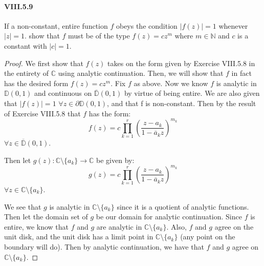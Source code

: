 \documentclass[10pt]{article}
\begin{document}
\maketitle


\paragraph{VIII.5.9}
If a non-constant, entire function $f$ obeys the condition $|f(z)| = 1$ whenever $|z| = 1$. show that $f$ must be of the type $f(z) = cz^m$ where $m \in \mathbb{N}$ and $c$ is a constant with $|c| = 1$. 

\begin{proof}
We first show that $f(z)$ takes on the form given by Exercise VIII.5.8 in the entirety of $\mathbb{C}$ using analytic continuation. Then, we will show that $f$ in fact has the desired form $f(z) = cz^m$. Fix $f$ as above. Now we know $f$ is analytic in $\mathbb{D}(0,1)$ and continuous on $\overline{\mathbb{D}}(0,1)$ by virtue of being entire. We are also given that $|f(z)| = 1$ $\forall z \in \partial \mathbb{D}(0,1)$, and that f is non-constant. Then by the result of Exercise VIII.5.8 that $f$ has the form: 
\[f(z) = c \prod_{k = 1}^r \left(\frac{z - a_k}{1 - \overline{a}_kz}\right)^{m_k}\]
$\forall z \in \overline{\mathbb{D}}(0,1)$. 

	 Then let $g(z):\mathbb{C} \setminus \{a_k\} \rightarrow \mathbb{C}$ be given by:
\[g(z) = c \prod_{k = 1}^r \left(\frac{z - a_k}{1 - \overline{a}_kz}\right)^{m_k}\]
$\forall z \in \mathbb{C} \setminus \{a_k\}$. 


We see that $g$ is analytic in $\mathbb{C} \setminus \{a_k\}$ since it is a quotient of analytic functions. Then let the domain set of $g$ be our domain for analytic continuation. Since $f$ is entire, we know that $f$ and $g$ are analytic in $\mathbb{C} \setminus \{a_k\}$. Also, $f$ and $g$ agree on the unit disk, and the unit disk has a limit point in $\mathbb{C} \setminus \{a_k\}$ (any point on the boundary will do). Then by analytic continuation, we have that $f$ and $g$ agree on $\mathbb{C} \setminus \{a_k\}$. 



\end{proof}
\end{document}
